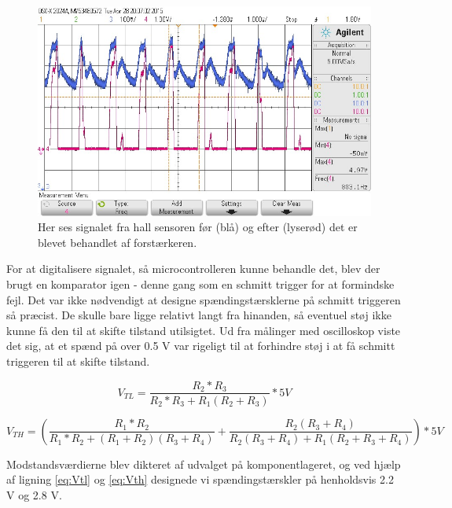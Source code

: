 \begin{figure}[h]

	\centering
		\includegraphics[scale=0.4]{Billeder/Signal1.jpg}
	\caption{Her ses signalet fra hall sensoren før (blå) og efter (lyserød) det er blevet behandlet af forstærkeren.}
	\label{fig:Signal1}
	
\end{figure}

For at digitalisere signalet, så microcontrolleren kunne behandle det, blev der brugt en komparator igen - denne gang som en schmitt trigger for at formindske fejl. Det var ikke nødvendigt at designe spændingstærsklerne på schmitt triggeren så præcist. De skulle bare ligge relativt langt fra hinanden, så eventuel støj ikke kunne få den til at skifte tilstand utilsigtet. Ud fra  målinger med oscilloskop viste det sig, at et spænd på over 0.5 V var rigeligt til at forhindre støj i at få schmitt triggeren til at skifte tilstand.

\begin{equation}
V_{TL} = \dfrac{R_{2}*R_{3}}{R_{2}*R_{3}+R_{1}(R_{2}+R_{3})}*5V
\label{eq:Vtl}
\end{equation}


\begin{equation}
V_{TH} = \left(\dfrac{R_{1}*R_{2}}{R_{1}*R_{2}+(R_{1}+R_{2})(R_{3}+R_{4})} + \dfrac{R_{2}(R_{3}+R_{4})}{R_{2}(R_{3}+R_{4})+R_{1}(R_{2}+R_{3}+R_{4})}\right)*5V
\label{eq:Vth}
\end{equation}



Modstandsværdierne blev dikteret af udvalget på komponentlageret, og ved hjælp af ligning \eqref{eq:Vtl} og \eqref{eq:Vth} designede vi spændingstærskler på henholdsvis 2.2 V og 2.8 V. 

